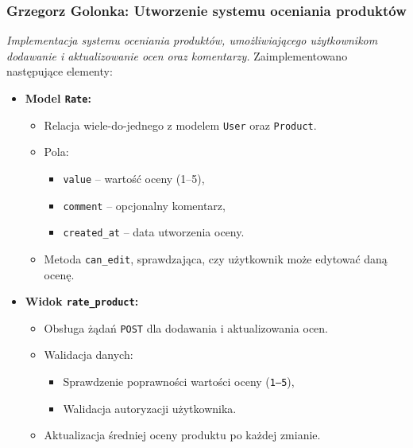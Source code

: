 \documentclass[12pt,a4paper,oneside]{article}
\theoremstyle{definition}
\numberwithin{equation}{section}
\begin{document}
\subsubsection{Grzegorz Golonka: Utworzenie systemu oceniania produktów}
\label{section:1.3.32}
\textit{
Implementacja systemu oceniania produktów, umożliwiającego użytkownikom dodawanie i aktualizowanie ocen oraz komentarzy.
}
Zaimplementowano następujące elementy:
\begin{itemize}
    \item \textbf{Model \texttt{Rate}:}
    \begin{itemize}
        \item Relacja wiele-do-jednego z modelem \texttt{User} oraz \texttt{Product}.
        \item Pola:
        \begin{itemize}
            \item \texttt{value} – wartość oceny (1–5),
            \item \texttt{comment} – opcjonalny komentarz,
            \item \texttt{created\_at} – data utworzenia oceny.
        \end{itemize}
        \item Metoda \texttt{can\_edit}, sprawdzająca, czy użytkownik może edytować daną ocenę.
    \end{itemize}
    \item \textbf{Widok \texttt{rate\_product}:}
    \begin{itemize}
        \item Obsługa żądań \texttt{POST} dla dodawania i aktualizowania ocen.
        \item Walidacja danych:
        \begin{itemize}
            \item Sprawdzenie poprawności wartości oceny (\texttt{1–5}),
            \item Walidacja autoryzacji użytkownika.
        \end{itemize}
        \item Aktualizacja średniej oceny produktu po każdej zmianie.
    \end{itemize}
\end{itemize}
% 
% 
\end{document}
